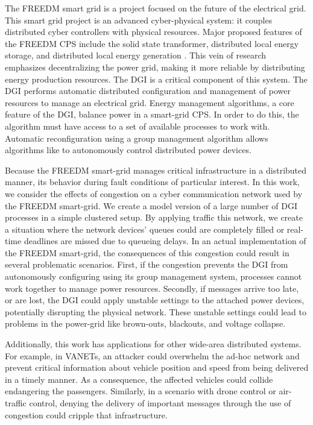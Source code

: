 
The \ac{FREEDM} smart grid is a project focused on the future of the electrical grid.
This smart grid project is an advanced cyber-physical system: it couples distributed cyber controllers with physical resources.
Major proposed features of the \ac{FREEDM} \ac{CPS} include the solid state transformer, distributed local energy storage, and distributed local energy generation \cite{FREEDMMIGRATION}.
This vein of research emphasizes decentralizing the power grid, making it more reliable by distributing energy production resources.
The \ac{DGI} is a critical component of this system.
The \ac{DGI} performs automatic distributed configuration and management of power resources to manage an electrical grid.
Energy management algorithms, a core feature of the \ac{DGI}\cite{LOADBALANCING}, balance power in a smart-grid \ac{CPS}.
In order to do this, the algorithm must have access to a set of available processes to work with.
Automatic reconfiguration using a group management algorithm allows algorithms like \cite{LOADBALANCING}\cite{ICC1}\cite{MOYEEN} to autonomously control distributed power devices.

Because the \ac{FREEDM} smart-grid manages critical infrastructure in a distributed manner, its behavior during fault conditions of particular interest.
In this work, we consider the effects of congestion on a cyber communication network used by the \ac{FREEDM} smart-grid.
We create a model version of a large number of \ac{DGI} processes in a simple clustered setup.
By applying traffic this network, we create a situation where the network devices' queues could are completely filled or real-time deadlines are missed due to queueing delays.
In an actual implementation of the \ac{FREEDM} smart-grid, the consequences of this congestion could result in several problematic scenarios.
First, if the congestion prevents the \ac{DGI} from autonomously configuring using its group management system, processes cannot work together to manage power resources.
Secondly, if messages arrive too late, or are lost, the \ac{DGI} could apply unstable settings to the attached power devices, potentially disrupting the physical network.
These unstable settings could lead to problems in the power-grid like brown-outs, blackouts, and voltage collapse.

Additionally, this work has applications for other wide-area distributed systems.
For example, in \ac{VANET}s, an attacker could overwhelm the ad-hoc network and prevent critical information about vehicle position and speed from being delivered in a timely manner.
As a consequence, the affected vehicles could collide endangering the passengers.
Similarly, in a scenario with drone control or air-traffic control, denying the delivery of important messages through the use of congestion could cripple that infrastructure.

